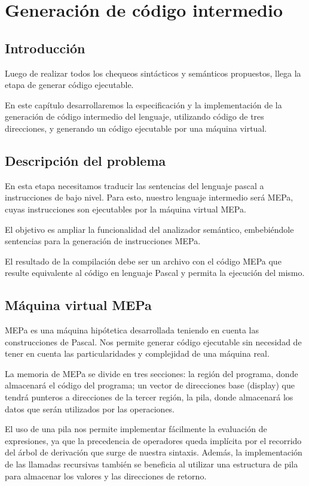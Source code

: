 \chapter{Generación de código intermedio}

\section{Introducción}
Luego de realizar todos los chequeos sintácticos y semánticos propuestos, llega la etapa de generar código ejecutable.

En este capítulo desarrollaremos la especificación y la implementación de la generación de código intermedio del lenguaje, utilizando código de tres direcciones, y generando un código ejecutable por una máquina virtual.

\section{Descripción del problema}
\label{sec:gen_cod:descr_prob}
En esta etapa necesitamos traducir las sentencias del lenguaje pascal a instrucciones de bajo nivel. Para esto, nuestro lenguaje intermedio será MEPa, cuyas instrucciones son ejecutables por la máquina virtual MEPa. 

El objetivo es ampliar la funcionalidad del analizador semántico, embebiéndole sentencias para la generación de instrucciones MEPa.

El resultado de la compilación debe ser un archivo con el código MEPa que resulte equivalente al código en lenguaje Pascal y permita la ejecución del mismo.

\section{Máquina virtual MEPa}
MEPa es una máquina hipótetica desarrollada teniendo en cuenta las construcciones de Pascal. Nos permite generar código ejecutable sin necesidad de tener en cuenta las particularidades y complejidad de una máquina real.

La memoria de MEPa se divide en tres secciones: la región del programa, donde almacenará el código del programa; un vector de direcciones base (display) que tendrá punteros a direcciones de la tercer región, la pila, donde almacenará los datos que serán utilizados por las operaciones. 

El uso de una pila nos permite implementar fácilmente la evaluación de expresiones, ya que la precedencia de operadores queda implícita por el recorrido del árbol de derivación que surge de nuestra sintaxis. Además, la implementación de las llamadas recursivas también se beneficia al utilizar una estructura de pila para almacenar los valores y las direcciones de retorno.

